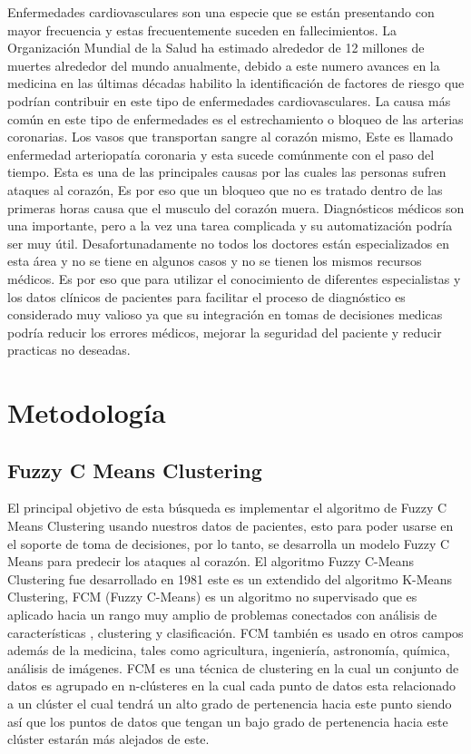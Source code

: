 \documentclass[10pt,journal]{IEEEtran}
\begin{document}
Enfermedades cardiovasculares son una especie que se están presentando con mayor frecuencia y estas frecuentemente suceden en fallecimientos. La Organización Mundial de la Salud ha estimado alrededor de 12 millones de muertes alrededor del mundo anualmente, debido a este numero avances en la medicina en las últimas décadas habilito la identificación de factores de riesgo que podrían contribuir en este tipo de enfermedades cardiovasculares. La causa más común en este tipo de enfermedades es el estrechamiento o bloqueo de las arterias coronarias. Los vasos que transportan sangre al corazón mismo, Este es llamado enfermedad arteriopatía coronaria y esta sucede comúnmente con el paso del tiempo. Esta es una de las principales causas por las cuales las personas sufren ataques al corazón, Es por eso que un bloqueo que no es tratado dentro de las primeras horas causa que el musculo del corazón muera. Diagnósticos médicos son una importante, pero a la vez una tarea complicada y su automatización podría ser muy útil. Desafortunadamente no todos los doctores están especializados en esta área y no se tiene en algunos casos y no se tienen los mismos recursos médicos. Es por eso que para utilizar el conocimiento de diferentes especialistas y los datos clínicos de pacientes para facilitar el proceso de diagnóstico es considerado muy valioso ya que su integración en tomas de decisiones medicas podría reducir los errores médicos, mejorar la seguridad del paciente y reducir practicas no deseadas.

\section{Metodología}
\label{sec:metodologia}


\subsection{Fuzzy C Means Clustering}

El principal objetivo de esta búsqueda es implementar el algoritmo de Fuzzy C Means Clustering usando nuestros datos de pacientes, esto para poder usarse en el soporte de toma de decisiones, por lo tanto, se desarrolla un modelo Fuzzy C Means para predecir los ataques al corazón.
El algoritmo Fuzzy C-Means Clustering fue desarrollado en 1981 este es un extendido del algoritmo K-Means Clustering,  FCM (Fuzzy C-Means) es un algoritmo no supervisado que es aplicado hacia un rango muy amplio de problemas conectados con análisis de características , clustering y clasificación. FCM también es usado en otros campos además de la medicina, tales como agricultura, ingeniería, astronomía, química, análisis de imágenes.
FCM es una técnica de clustering en la cual un conjunto de datos es agrupado en n-clústeres en la cual cada punto de datos esta relacionado a un clúster el cual tendrá un alto grado de pertenencia hacia este punto siendo así que los puntos de datos que tengan un bajo grado de pertenencia hacia este clúster estarán más alejados de este.
\end{document}

